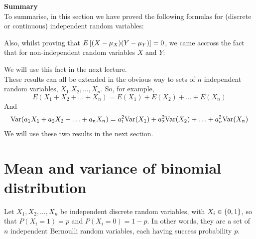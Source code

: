 \noindent \textbf{Summary} \\
To summarise, in this section we have proved the following formulas for (discrete or continuous) independent random variables:

  	\bigskip
	
	\hfil{}
	\bigskip
	\bigskip
	\bigskip
	\bigskip
	
\noindent Also, whilst proving that $E\left[(X - \mu_X)(Y - \mu_Y)\right] = 0$, we came accross the fact that for non-independent random variables $X$ and $Y$:
  	\bigskip
	
	\hfil{}
	\bigskip
	\bigskip
	
\noindent We will use this fact in the next lecture. \\

\noindent These results can all be extended in the obvious way to sets of $n$ independent random variables, $X_1.X_2,\ldots,X_n$. So, for example,
\[
E(X_1 + X_2 + \ldots + X_n) = E(X_1) + E(X_2) + \ldots + E(X_n)
\]
And
\[
\text{Var}(a_1X_1 + a_2X_2 + \ldots + a_nX_n) = a_1^2\text{Var}(X_1) + a_2^2\text{Var}(X_2) + \ldots + a_n^2\text{Var}(X_n)
\]
We will use these two results in the next section.

\section{Mean and variance of binomial distribution} \label{meanvarBinom}
Let $X_1,X_2,\ldots,X_n$ be independent discrete random variables, with $X_i \in \left\{0,1\right\}$, so that $P(X_i = 1) = p$ and $P(X_i = 0) = 1-p$. In other words, they are a set of $n$ independent Bernoulli random variables, each having success probability $p$. \\


